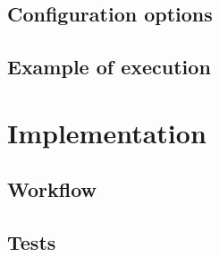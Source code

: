 \documentclass[12pt, a4paper]{report}
\begin{document}
\section{Configuration options}


\section{Example of execution}


\chapter{Implementation}
\section{Workflow}
\section{Tests}
\end{document}
